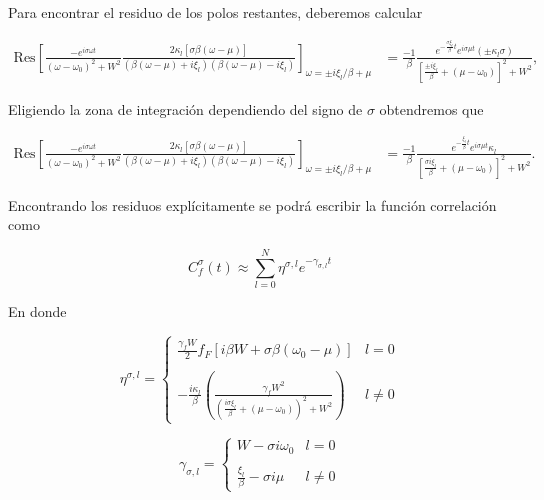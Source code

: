 \begin{appendixs}
Para encontrar el residuo de los polos restantes, deberemos calcular 

\begin{align*}
    \text{Res} \left[ \frac{-e^{i\sigma \omega t}}{(\omega - \omega_{0})^{2} + W^{2} } \frac{ 2\kappa_{l}[\sigma \beta (\omega-\mu)] }{ (\beta(\omega-\mu) + i \xi_{l} )(\beta(\omega-\mu) - i \xi_{l})} \right]_{\omega = \pm i \xi_{l}/\beta + \mu} & = \frac{-1}{\beta} \frac{e^{- \frac{\sigma \xi_{l}}{\beta}t} e^{i\sigma \mu t}(\pm \kappa_{l}\sigma )}{ [ \frac{ \pm i\xi_{l}}{\beta} + (\mu - \omega_{0}) ]^{2} + W^{2} } ,
\end{align*}

Eligiendo la zona de integración dependiendo del signo de $\sigma$ obtendremos que 

\begin{align*}
    \text{Res} \left[ \frac{-e^{i\sigma \omega t}}{(\omega - \omega_{0})^{2} + W^{2} } \frac{ 2\kappa_{l}[\sigma \beta (\omega-\mu)] }{ (\beta(\omega-\mu) + i \xi_{l} )(\beta(\omega-\mu) - i \xi_{l})} \right]_{\omega = \pm i \xi_{l}/\beta + \mu} & = \frac{-1}{\beta} \frac{e^{- \frac{ \xi_{l}}{\beta}t} e^{i\sigma \mu t} \kappa_{l} }{ [ \frac{ \sigma i\xi_{l}}{\beta} + (\mu - \omega_{0}) ]^{2} + W^{2} }. 
\end{align*}

Encontrando los residuos explícitamente se podrá escribir la función correlación como

\begin{equation}
    C^{\sigma}_{f}(t) \approx \sum_{l=0}^{N} \eta^{\sigma,l} e^{-\gamma_{\sigma,l} t}
    \label{correlationf}
\end{equation}

En donde 

\begin{equation*}
    \eta^{\sigma,l} = \left\{ \begin{array}{lc} \frac{\gamma_{f}W}{2} f_{F}[i\beta W + \sigma \beta (\omega_{0}-\mu)]  & l = 0 \\ \\ - \frac{i\kappa_{l}}{\beta} \left(\frac{\gamma_{f}W^{2}}{ (\frac{i\sigma \xi_{l}}{\beta} + (\mu-\omega_{0}))^{2} + W^{2} } \right) &  l \neq 0 \end{array} \right.
\end{equation*}

\begin{equation*}
    \gamma_{\sigma,l} =  \left\{ \begin{array}{lc} W- \sigma i \omega_{0}  & l = 0 \\ \\ \frac{\xi_{l}}{\beta} - \sigma i \mu &  l \neq 0 \end{array} \right.
\end{equation*}


\end{appendixs}
